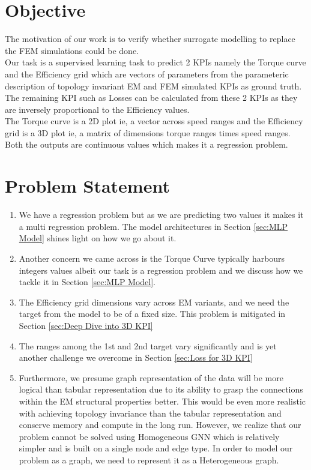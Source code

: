 \documentclass{report} %
\begin{document}
\section{Objective}\label{sec:Objective}
The motivation of our work is to verify whether surrogate modelling to replace the \ac{FEM} simulations could be done. \\
Our task is a supervised learning task to predict 2 KPIs namely the Torque curve and the Efficiency grid which are vectors of parameters 
from the parameteric description of topology invariant \ac{EM} and \ac{FEM} simulated KPIs as ground truth. \\ 
The remaining \ac{KPI} such as Losses can be calculated from these 2 KPIs as they are inversely proportional to the Efficiency values.\\
The Torque curve is a 2D plot ie, a vector across speed ranges and the Efficiency grid is a 3D plot ie, a matrix of dimensions torque ranges times speed ranges. \\
Both the outputs are continuous values which makes it a regression problem. 


\section{Problem Statement}\label{sec:Problem Statement}

\begin{enumerate}

    \item We have a regression problem but as we are predicting two values it makes it a multi regression problem. The model 
    architectures in Section \ref{sec:MLP Model} shines light on how we go about it.
    \item Another concern we came across is the Torque Curve typically harbours integers values albeit our task is a regression problem and we discuss how we tackle it in Section \ref{sec:MLP Model}. 
    \item The Efficiency grid dimensions vary across \ac{EM} variants, and we need the target from the model to be of a fixed size. This problem is mitigated in Section \ref{sec:Deep Dive into 3D KPI}
    \item The ranges among the 1st and 2nd target vary significantly and is yet another challenge we overcome in Section \ref{sec:Loss for 3D KPI}
    \item Furthermore, we presume graph representation of the data will be more logical than tabular representation due to its ability to grasp the connections within the \ac{EM} structural properties better.
    This would be even more realistic with achieving topology invariance than the tabular representation and conserve memory and compute in the long run.
    However, we realize that our problem cannot be solved using Homogeneous \ac{GNN} which is relatively simpler and is built on a single node and edge type.
    In order to model our problem as a graph, we need to represent it as a Heterogeneous graph. \\

\end{enumerate}
\end{document}
